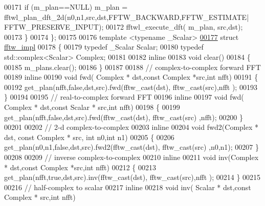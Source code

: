 \begin{DoxyCode}
00171           \textcolor{keywordflow}{if} (m\_plan==NULL) m\_plan = fftwl\_plan\_dft\_2d(n0,n1,src,dst,FFTW\_BACKWARD,FFTW\_ESTIMATE|
      FFTW\_PRESERVE\_INPUT);
00172           fftwl\_execute\_dft( m\_plan, src,dst);
00173       \}
00174   \};
00175 
00176   \textcolor{keyword}{template} <\textcolor{keyword}{typename} \_Scalar>
\hyperlink{struct_eigen_1_1internal_1_1fftw__impl}{00177}   \textcolor{keyword}{struct }\hyperlink{struct_eigen_1_1internal_1_1fftw__impl}{fftw\_impl}
00178   \{
00179       \textcolor{keyword}{typedef} \_Scalar Scalar;
00180       \textcolor{keyword}{typedef} std::complex<Scalar> Complex;
00181 
00182       \textcolor{keyword}{inline}
00183       \textcolor{keywordtype}{void} clear() 
00184       \{
00185         m\_plans.clear();
00186       \}
00187 
00188       \textcolor{comment}{// complex-to-complex forward FFT}
00189       \textcolor{keyword}{inline}
00190       \textcolor{keywordtype}{void} fwd( Complex * dst,\textcolor{keyword}{const} Complex *src,\textcolor{keywordtype}{int} nfft)
00191       \{
00192         get\_plan(nfft,\textcolor{keyword}{false},dst,src).fwd(fftw\_cast(dst), fftw\_cast(src),nfft );
00193       \}
00194 
00195       \textcolor{comment}{// real-to-complex forward FFT}
00196       \textcolor{keyword}{inline}
00197       \textcolor{keywordtype}{void} fwd( Complex * dst,\textcolor{keyword}{const} Scalar * src,\textcolor{keywordtype}{int} nfft) 
00198       \{
00199           get\_plan(nfft,\textcolor{keyword}{false},dst,src).fwd(fftw\_cast(dst), fftw\_cast(src) ,nfft);
00200       \}
00201 
00202       \textcolor{comment}{// 2-d complex-to-complex}
00203       \textcolor{keyword}{inline}
00204       \textcolor{keywordtype}{void} fwd2(Complex * dst, \textcolor{keyword}{const} Complex * src, \textcolor{keywordtype}{int} n0,\textcolor{keywordtype}{int} n1)
00205       \{
00206           get\_plan(n0,n1,\textcolor{keyword}{false},dst,src).fwd2(fftw\_cast(dst), fftw\_cast(src) ,n0,n1);
00207       \}
00208 
00209       \textcolor{comment}{// inverse complex-to-complex}
00210       \textcolor{keyword}{inline}
00211       \textcolor{keywordtype}{void} inv(Complex * dst,\textcolor{keyword}{const} Complex  *src,\textcolor{keywordtype}{int} nfft)
00212       \{
00213         get\_plan(nfft,\textcolor{keyword}{true},dst,src).inv(fftw\_cast(dst), fftw\_cast(src),nfft );
00214       \}
00215 
00216       \textcolor{comment}{// half-complex to scalar}
00217       \textcolor{keyword}{inline}
00218       \textcolor{keywordtype}{void} inv( Scalar * dst,\textcolor{keyword}{const} Complex * src,\textcolor{keywordtype}{int} nfft) 

\end{DoxyCode}
